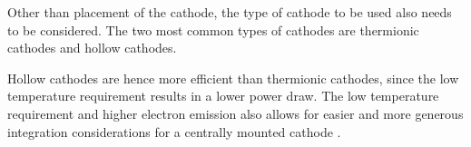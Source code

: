 Other than placement of the cathode, the type of cathode to be used also needs to be considered. The two most common types of cathodes are thermionic cathodes and hollow cathodes. 


Hollow cathodes are hence more efficient than thermionic cathodes, since the low temperature requirement results in a lower power draw. The low temperature requirement and higher electron emission also allows for easier and more generous integration considerations for a centrally mounted cathode \cite{nasajpltext}. 